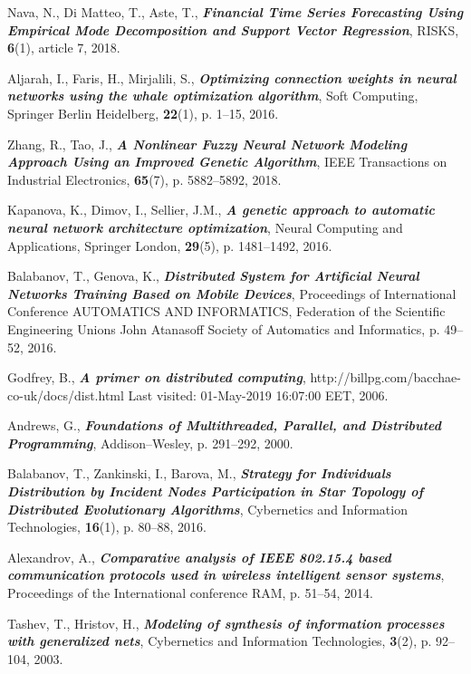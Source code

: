 \documentclass[graybox]{svmult}
\begin{document}
\begin{thebibliography}{99}

 Nava, N., Di Matteo, T., Aste, T., \textbf{\textit{Financial Time Series Forecasting Using Empirical Mode Decomposition and Support Vector Regression}}, RISKS, \textbf{6}(1), article 7, 2018.

 Aljarah, I., Faris, H., Mirjalili, S., \textbf{\textit{Optimizing connection weights in neural networks using the whale optimization algorithm}}, Soft Computing, Springer Berlin Heidelberg, \textbf{22}(1), p. 1--15, 2016.

 Zhang, R., Tao, J., \textbf{\textit{A Nonlinear Fuzzy Neural Network Modeling Approach Using an Improved Genetic Algorithm}}, IEEE Transactions on Industrial Electronics, \textbf{65}(7), p. 5882--5892, 2018.

 Kapanova, K., Dimov, I., Sellier, J.M., \textbf{\textit{A genetic approach to automatic neural network architecture optimization}}, Neural Computing and Applications, Springer London, \textbf{29}(5), p. 1481--1492, 2016.

 Balabanov, T., Genova, K., \textbf{\textit{Distributed System for Artificial Neural Networks Training Based on Mobile Devices}}, Proceedings of International Conference AUTOMATICS AND INFORMATICS, Federation of the Scientific Engineering Unions John Atanasoff Society of Automatics and Informatics, p. 49--52, 2016.

 Godfrey, B., \textbf{\textit{A primer on distributed computing}}, http://billpg.com/bacchae-co-uk/docs/dist.html Last visited: 01-May-2019 16:07:00 EET, 2006.

 Andrews, G., \textbf{\textit{Foundations of Multithreaded, Parallel, and Distributed Programming}}, Addison–Wesley, p. 291--292, 2000.

 Balabanov, T., Zankinski, I., Barova, M., \textbf{\textit{Strategy for Individuals Distribution by Incident Nodes Participation in Star Topology of Distributed Evolutionary Algorithms}}, Cybernetics and Information Technologies, \textbf{16}(1), p. 80--88, 2016.

 Alexandrov, A., \textbf{\textit{Comparative analysis of IEEE 802.15.4 based communication protocols used in wireless intelligent sensor systems}}, Proceedings of the International conference RAM, p. 51--54, 2014.

 Tashev, T., Hristov, H., \textbf{\textit{Modeling of synthesis of information processes with generalized nets}}, Cybernetics and Information Technologies, \textbf{3}(2), p. 92--104, 2003.

\end{thebibliography}
\end{document}
